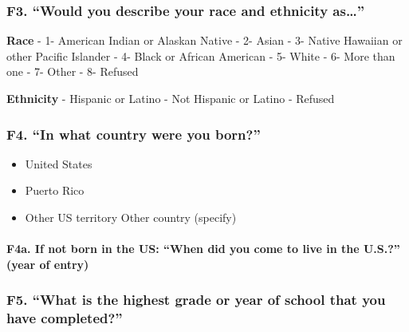 \documentclass[
  12pt,
]{book}
\providecommand{\tightlist}{%
  \setlength{\itemsep}{0pt}\setlength{\parskip}{0pt}}
\begin{document}
\hypertarget{f3.-would-you-describe-your-race-and-ethnicity-as}{%
\subsubsection*{\texorpdfstring{F3. ``Would you describe your race and ethnicity as\ldots{}''}{F3. ``Would you describe your race and ethnicity as\ldots''}}\label{f3.-would-you-describe-your-race-and-ethnicity-as}}

\textbf{Race}
- 1- American Indian or Alaskan Native
- 2- Asian
- 3- Native Hawaiian or other Pacific Islander
- 4- Black or African American
- 5- White
- 6- More than one
- 7- Other
- 8- Refused

\textbf{Ethnicity}
- Hispanic or Latino
- Not Hispanic or Latino
- Refused

\hypertarget{f4.-in-what-country-were-you-born}{%
\subsubsection*{F4. ``In what country were you born?''}\label{f4.-in-what-country-were-you-born}}

\begin{itemize}
\tightlist
\item
  United States
\item
  Puerto Rico
\item
  Other US territory Other country (specify)
\end{itemize}

\hypertarget{f4a.-if-not-born-in-the-us-when-did-you-come-to-live-in-the-u.s.-year-of-entry}{%
\paragraph*{F4a. If not born in the US: ``When did you come to live in the U.S.?'' (year of entry)}\label{f4a.-if-not-born-in-the-us-when-did-you-come-to-live-in-the-u.s.-year-of-entry}}

\hypertarget{f5.-what-is-the-highest-grade-or-year-of-school-that-you-have-completed}{%
\subsubsection*{F5. ``What is the highest grade or year of school that you have completed?''}\label{f5.-what-is-the-highest-grade-or-year-of-school-that-you-have-completed}}
\end{document}
